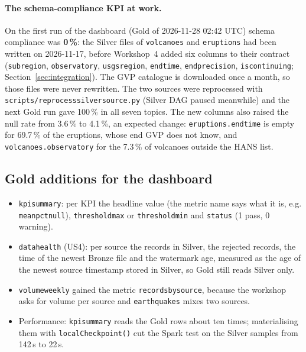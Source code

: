\documentclass[11pt,a4paper]{article}
\renewcommand{\_}{\textunderscore\allowbreak}
\begin{document}
\paragraph{The schema-compliance KPI at work.} On the first run of the dashboard (Gold of 2026-11-28
02:42 UTC) schema compliance was \textbf{0\,\%}: the Silver files of \texttt{volcanoes} and
\texttt{eruptions} had been written on 2026-11-17, before Workshop~4 added six columns to their contract
(\texttt{subregion}, \texttt{observatory}, \texttt{usgs\_region}, \texttt{end\_time},
\texttt{end\_precision}, \texttt{is\_continuing}; Section~\ref{sec:integration}). The GVP catalogue is
downloaded once a month, so those files were never rewritten. The two sources were reprocessed with
\texttt{scripts/reprocess\_silver\_source.py} (Silver DAG paused meanwhile) and the next Gold run gave
100\,\% in all seven topics. The new columns also raised the null rate from 3.6\,\% to 4.1\,\%, an expected
change: \texttt{eruptions.end\_time} is empty for 69.7\,\% of the eruptions, whose end GVP does not know,
and \texttt{volcanoes.observatory} for the 7.3\,\% of volcanoes outside the HANS list.

\subsection{Gold additions for the dashboard}
\begin{itemize}
  \item \texttt{kpi\_summary}: per KPI the headline value (the metric name says what it is, e.g.
        \texttt{mean\_pct\_null}), \texttt{threshold\_max} or \texttt{threshold\_min} and \texttt{status}
        (1 pass, 0 warning).
  \item \texttt{data\_health} (US4): per source the records in Silver, the rejected records, the time of the
        newest Bronze file and the watermark age, measured as the age of the newest source timestamp stored
        in Silver, so Gold still reads Silver only.
  \item \texttt{volume\_weekly} gained the metric \texttt{records\_by\_source}, because the workshop asks
        for volume per source and \texttt{earthquakes} mixes two sources.
  \item Performance: \texttt{kpi\_summary} reads the Gold rows about ten times; materialising them with
        \texttt{localCheckpoint()} cut the Spark test on the Silver samples from 142\,s to 22\,s.
\end{itemize}
\end{document}
